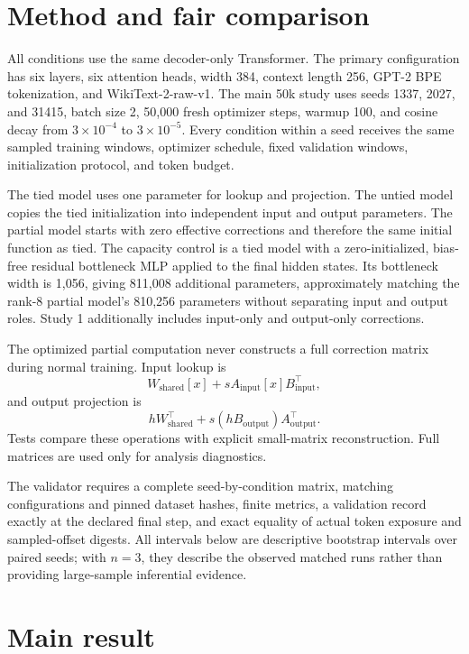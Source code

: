 \documentclass[11pt]{article}
\begin{document}
\section{Method and fair comparison}

All conditions use the same decoder-only Transformer. The primary configuration has six layers, six attention heads, width 384, context length 256, GPT-2 BPE tokenization, and WikiText-2-raw-v1. The main 50k study uses seeds 1337, 2027, and 31415, batch size 2, 50,000 fresh optimizer steps, warmup 100, and cosine decay from $3\times10^{-4}$ to $3\times10^{-5}$. Every condition within a seed receives the same sampled training windows, optimizer schedule, fixed validation windows, initialization protocol, and token budget.

The tied model uses one parameter for lookup and projection. The untied model copies the tied initialization into independent input and output parameters. The partial model starts with zero effective corrections and therefore the same initial function as tied. The capacity control is a tied model with a zero-initialized, bias-free residual bottleneck MLP applied to the final hidden states. Its bottleneck width is 1,056, giving 811,008 additional parameters, approximately matching the rank-8 partial model's 810,256 parameters without separating input and output roles. Study 1 additionally includes input-only and output-only corrections.

The optimized partial computation never constructs a full correction matrix during normal training. Input lookup is
\[
W_{\mathrm{shared}}[x] + s A_{\mathrm{input}}[x]B_{\mathrm{input}}^\top,
\]
and output projection is
\[
hW_{\mathrm{shared}}^\top + s(hB_{\mathrm{output}})A_{\mathrm{output}}^\top.
\]
Tests compare these operations with explicit small-matrix reconstruction. Full matrices are used only for analysis diagnostics.

The validator requires a complete seed-by-condition matrix, matching configurations and pinned dataset hashes, finite metrics, a validation record exactly at the declared final step, and exact equality of actual token exposure and sampled-offset digests. All intervals below are descriptive bootstrap intervals over paired seeds; with $n=3$, they describe the observed matched runs rather than providing large-sample inferential evidence.

\section{Main result}
\end{document}

